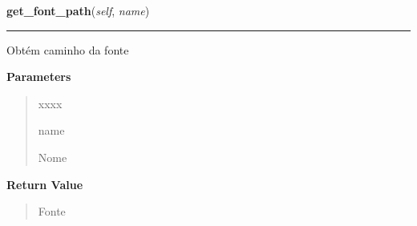 \hspace{.8\funcindent}\begin{boxedminipage}{\funcwidth}

    \raggedright \textbf{get\_font\_path}(\textit{self}, \textit{name})

    \vspace{-1.5ex}

    \rule{\textwidth}{0.5\fboxrule}
\setlength{\parskip}{2ex}
    Obtém caminho da fonte

\setlength{\parskip}{1ex}
      \textbf{Parameters}
      \vspace{-1ex}

      \begin{quote}
        \begin{Ventry}{xxxx}

          \item[name]

          Nome

        \end{Ventry}

      \end{quote}

      \textbf{Return Value}
    \vspace{-1ex}

      \begin{quote}
      Fonte

      \end{quote}

    \end{boxedminipage}

    \label{pygame-asteroids:resource_manager:ResourceManager:get_font_small}

    \vspace{0.5ex}


